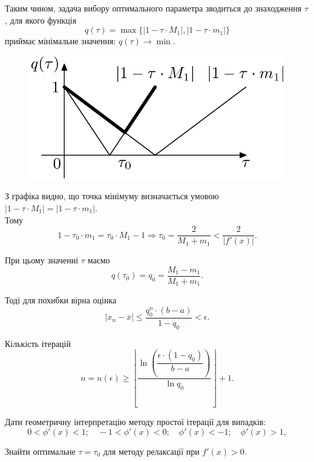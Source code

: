 Таким чином, задача вибору оптимального параметра зводиться до знаходження $\tau$, для якого функція \[ q(\tau) = \max\{|1-\tau \cdot M_1|,|1-\tau \cdot m_1|\}\]
приймає мінімальне значення: $q(\tau)\to\min$.

\begin{figure}[H]
	\centering
	\includegraphics[width=.5\linewidth]{mal-1.png}
\end{figure}


З графіка видно, що точка мінімуму визначається умовою $|1 - \tau \cdot M_1| = |1 - \tau \cdot m_1|$. \\

Тому
\[ 1 - \tau_0 \cdot m_1 = \tau_0 \cdot M_1 - 1 \Rightarrow \tau_0 = \dfrac{2}{M_1+m_1} < \dfrac{2}{|f'(x)|}.\]

При цьому значенні $\tau$ маємо \[q(\tau_0) = q_0 =\dfrac{M_1-m_1}{M_1+m_1}.\]

Тоді для похибки вірна оцінка \[|x_n-\overline{x}|\le \dfrac{q_0^n\cdot (b-a)}{1-q_0}<\epsilon.\]

Кількість ітерацій \[n = n(\epsilon) \ge \left\lfloor \dfrac{\ln \left(\dfrac{\epsilon\cdot(1-q_0)}{b-a}\right)}{\ln q_0} \right\rfloor + 1.\]	

\begin{problem} 
	Дати геометричну інтерпретацію методу простої ітерації для випадків:
	\[ 0 < \phi'(x) < 1; \quad -1 < \phi'(x) < 0; \quad \phi'(x) < -1; \quad \phi'(x) > 1,\]
\end{problem}

\begin{problem} 
	Знайти оптимальне $\tau = \tau_0$ для методу релаксації при $f'(x) > 0$.
\end{problem}

